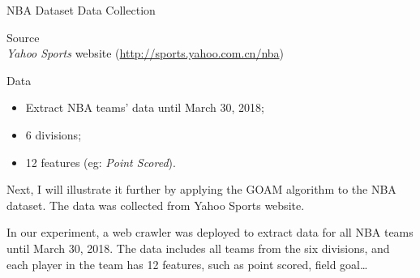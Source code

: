 \documentclass[
 size=14pt,
 paper=smartboard,  %
 mode=present, 		%
 display=slides, 	%
 style=tuliplab,  	%
 pauseslide,
 fleqn,leqno]{powerdot}
\begin{document}
\begin{slide}{NBA Dataset}
Data Collection
\begin{description}[type=1]
\item
Source\\
\qquad
\emph{Yahoo Sports} website (\url{http://sports.yahoo.com.cn/nba})

\item
Data

\begin{itemize}
 \item Extract NBA teams' data until March 30, 2018;
 \item 6 divisions;
 \item 12 features (eg: \emph{Point Scored}).
\end{itemize}
\end{description}

\begin{note}
Next,
I will illustrate it further by applying the GOAM algorithm to the NBA dataset.
The data was collected from Yahoo Sports website.

In our experiment,
a web crawler was deployed to extract data
for all NBA teams until March 30, 2018.
The data includes all teams from the six divisions,
and each player in the team has 12 features,
such as point scored, field goal\dots
\end{note}

\end{slide}
\end{document}
